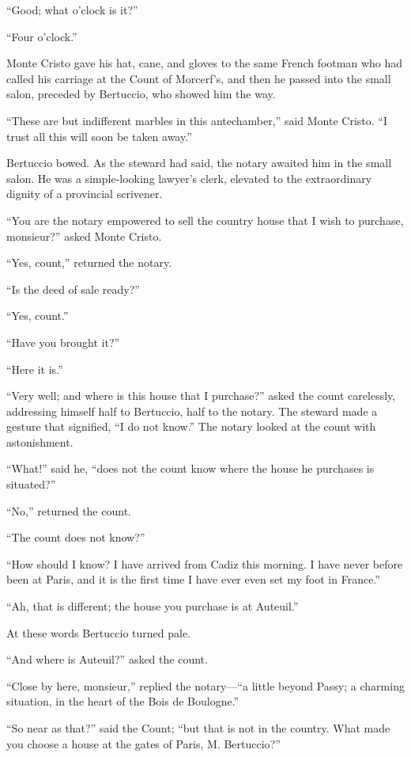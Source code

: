 “Good; what o’clock is it?”

“Four o’clock.”

Monte Cristo gave his hat, cane, and gloves to the same French footman
who had called his carriage at the Count of Morcerf’s, and then he
passed into the small salon, preceded by Bertuccio, who showed him the
way.

“These are but indifferent marbles in this antechamber,” said Monte
Cristo. “I trust all this will soon be taken away.”

Bertuccio bowed. As the steward had said, the notary awaited him in the
small salon. He was a simple-looking lawyer’s clerk, elevated to the
extraordinary dignity of a provincial scrivener.

“You are the notary empowered to sell the country house that I wish to
purchase, monsieur?” asked Monte Cristo.

“Yes, count,” returned the notary.

“Is the deed of sale ready?”

“Yes, count.”

“Have you brought it?”

“Here it is.”

“Very well; and where is this house that I purchase?” asked the count
carelessly, addressing himself half to Bertuccio, half to the notary.
The steward made a gesture that signified, “I do not know.” The notary
looked at the count with astonishment.

“What!” said he, “does not the count know where the house he purchases
is situated?”

“No,” returned the count.

“The count does not know?”

“How should I know? I have arrived from Cadiz this morning. I have
never before been at Paris, and it is the first time I have ever even
set my foot in France.”

“Ah, that is different; the house you purchase is at Auteuil.”

At these words Bertuccio turned pale.

“And where is Auteuil?” asked the count.

“Close by here, monsieur,” replied the notary—“a little beyond Passy; a
charming situation, in the heart of the Bois de Boulogne.”

“So near as that?” said the Count; “but that is not in the country.
What made you choose a house at the gates of Paris, M. Bertuccio?”

